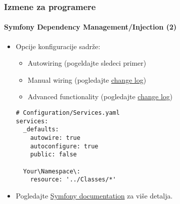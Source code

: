 \begin{frame}[fragile]
	\frametitle{Izmene za programere}
	\framesubtitle{Symfony Dependency Management/Injection (2)}

	\lstset{basicstyle=\tiny\ttfamily}

	\begin{itemize}
		\item Opcije konfiguracije sadrže:

			\begin{itemize}
				\item Autowiring (pogeldajte sledeci primer)
				\item Manual wiring
					(pogledajte \href{https://docs.typo3.org/c/typo3/cms-core/master/en-us/Changelog/10.0/Feature-84112-SymfonyDependencyInjectionForCoreAndExtbase.html}{change log})
				\item Advanced functionality
					(pogledajte \href{https://docs.typo3.org/c/typo3/cms-core/master/en-us/Changelog/10.0/Feature-84112-SymfonyDependencyInjectionForCoreAndExtbase.html}{change log})
			\end{itemize}


\begin{lstlisting}
# Configuration/Services.yaml
services:
  _defaults:
    autowire: true
    autoconfigure: true
    public: false

  Your\Namespace\:
    resource: '../Classes/*'
\end{lstlisting}

		\item Pogledajte \href{https://symfony.com/doc/current/service_container.html}{Symfony documentation} za više detalja.

	\end{itemize}

\end{frame}


